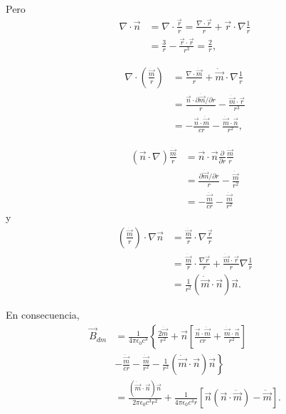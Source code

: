 \documentclass[12pt,a4paper]{book}
\begin{document}
Pero
\begin{align}
\nabla \cdot \vec{n} &= \nabla \cdot \frac{\vec{r}}{r} = \frac{\nabla \cdot \vec{r}}{r} + \vec{r} \cdot \nabla\frac{1}{r} \nonumber \\
&= \frac{3}{r} - \frac{\vec{r} \cdot \vec{r}}{r^3} = \frac{2}{r},
\end{align}

\begin{align}
\nabla \cdot \left(\frac{\dot{\vec{m}}}{r}\right) &= \frac{\nabla \cdot \dot{\vec{m}}}{r} + \dot{\vec{m}} \cdot \nabla\frac{1}{r} \nonumber \\
&= \frac{\vec{n} \cdot \partial\dot{\vec{m}}/\partial r}{r} - \frac{\dot{\vec{m}} \cdot \vec{r}}{r^3} \nonumber \\
&= -\frac{\vec{n} \cdot \ddot{\vec{m}}}{cr} - \frac{\dot{\vec{m}} \cdot \vec{n}}{r^2},
\end{align}

\begin{align}
(\vec{n} \cdot \nabla)\frac{\dot{\vec{m}}}{r} &= \vec{n} \cdot \vec{n}\frac{\partial}{\partial r}\frac{\dot{\vec{m}}}{r} \nonumber \\
&= \frac{\partial\dot{\vec{m}}/\partial r}{r} - \frac{\dot{\vec{m}}}{r^2} \nonumber \\
&= -\frac{\ddot{\vec{m}}}{cr} - \frac{\dot{\vec{m}}}{r^2}
\end{align}
y
\begin{align}
\left(\frac{\dot{\vec{m}}}{r}\right) \cdot \nabla\vec{n} &= \frac{\dot{\vec{m}}}{r} \cdot \nabla\frac{\vec{r}}{r} \nonumber \\
&= \frac{\dot{\vec{m}}}{r} \cdot \frac{\nabla\vec{r}}{r} + \frac{\dot{\vec{m}} \cdot \vec{r}}{r}\nabla\frac{1}{r} \nonumber \\
&= \frac{1}{r^2}(\dot{\vec{m}} \cdot \vec{n})\vec{n}.
\end{align}

En consecuencia,
\begin{align}
\vec{B}_{dm} &= \frac{1}{4\pi\epsilon_0 c^3}\left\{\frac{2\dot{\vec{m}}}{r^2} + \vec{n}\left[\frac{\vec{n} \cdot \ddot{\vec{m}}}{cr} + \frac{\dot{\vec{m}} \cdot \vec{n}}{r^2}\right] \right. \nonumber \\
&\left. -\frac{\ddot{\vec{m}}}{cr} - \frac{\dot{\vec{m}}}{r^2} - \frac{1}{r^2}(\dot{\vec{m}} \cdot \vec{n})\vec{n}\right\} \nonumber \\
&= \frac{(\dot{\vec{m}} \cdot \vec{n})\vec{n}}{2\pi\epsilon_0c^3 r^2} + \frac{1}{4\pi\epsilon_0c^4 r}[\vec{n}(\vec{n} \cdot \ddot{\vec{m}}) - \ddot{\vec{m}}].
\end{align}
\end{document}
